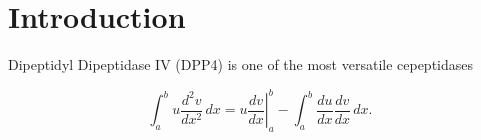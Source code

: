 \section{Introduction}
\label{intro} 

Dipeptidyl Dipeptidase IV (DPP4) is one of the most versatile cepeptidases   

\begin{equation}
\label{eqn:drag}
	\int_a^bu\frac{d^2v}{dx^2}\,dx
	=\left.u\frac{dv}{dx}\right|_a^b
	-\int_a^b\frac{du}{dx}\frac{dv}{dx}\,dx.
\end{equation}
